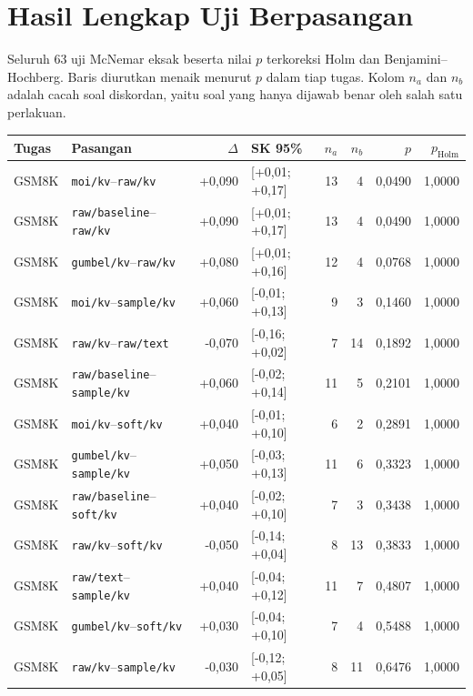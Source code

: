 
\chapter{Hasil Lengkap Uji Berpasangan}
\label{lamp:uji}

Seluruh 63 uji McNemar eksak beserta nilai $p$ terkoreksi Holm dan Benjamini--Hochberg. Baris diurutkan menaik menurut $p$ dalam tiap tugas. Kolom $n_a$ dan $n_b$ adalah cacah soal diskordan, yaitu soal yang hanya dijawab benar oleh salah satu perlakuan.

\begin{longtable}{llrlrrrr}
\hline
Tugas & Pasangan & $\Delta$ & SK 95\% & $n_a$ & $n_b$ & $p$ & $p_{\text{Holm}}$ \\
\hline\endhead
GSM8K & \texttt{moi/kv}--\texttt{raw/kv} & +0,090 & [+0,01; +0,17] & 13 & 4 & 0,0490 & 1,0000 \\
GSM8K & \texttt{raw/baseline}--\texttt{raw/kv} & +0,090 & [+0,01; +0,17] & 13 & 4 & 0,0490 & 1,0000 \\
GSM8K & \texttt{gumbel/kv}--\texttt{raw/kv} & +0,080 & [+0,01; +0,16] & 12 & 4 & 0,0768 & 1,0000 \\
GSM8K & \texttt{moi/kv}--\texttt{sample/kv} & +0,060 & [-0,01; +0,13] & 9 & 3 & 0,1460 & 1,0000 \\
GSM8K & \texttt{raw/kv}--\texttt{raw/text} & -0,070 & [-0,16; +0,02] & 7 & 14 & 0,1892 & 1,0000 \\
GSM8K & \texttt{raw/baseline}--\texttt{sample/kv} & +0,060 & [-0,02; +0,14] & 11 & 5 & 0,2101 & 1,0000 \\
GSM8K & \texttt{moi/kv}--\texttt{soft/kv} & +0,040 & [-0,01; +0,10] & 6 & 2 & 0,2891 & 1,0000 \\
GSM8K & \texttt{gumbel/kv}--\texttt{sample/kv} & +0,050 & [-0,03; +0,13] & 11 & 6 & 0,3323 & 1,0000 \\
GSM8K & \texttt{raw/baseline}--\texttt{soft/kv} & +0,040 & [-0,02; +0,10] & 7 & 3 & 0,3438 & 1,0000 \\
GSM8K & \texttt{raw/kv}--\texttt{soft/kv} & -0,050 & [-0,14; +0,04] & 8 & 13 & 0,3833 & 1,0000 \\
GSM8K & \texttt{raw/text}--\texttt{sample/kv} & +0,040 & [-0,04; +0,12] & 11 & 7 & 0,4807 & 1,0000 \\
GSM8K & \texttt{gumbel/kv}--\texttt{soft/kv} & +0,030 & [-0,04; +0,10] & 7 & 4 & 0,5488 & 1,0000 \\
GSM8K & \texttt{raw/kv}--\texttt{sample/kv} & -0,030 & [-0,12; +0,05] & 8 & 11 & 0,6476 & 1,0000 \\

\end{longtable}
